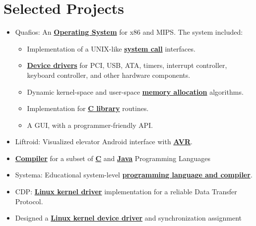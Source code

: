 \documentclass[letterpaper]{twentysecondcv} %
\begin{document}

\section{Selected Projects}

\begin{itemize}
    \item{Quafios: An \textbf{\underline{Operating System}} for x86 and MIPS. The system included:
          \begin{itemize}
            \item Implementation of a UNIX-like \textbf{\underline{system call}} interfaces.
            \item \textbf{\underline{Device drivers}} for PCI, USB, ATA, timers, interrupt controller,
                  keyboard controller, and other hardware components.
            \item Dynamic kernel-space and user-space \textbf{\underline{memory allocation}} algorithms.
            \item Implementation for \textbf{\underline{C library}} routines.
            \item A GUI, with a programmer-friendly API.
          \end{itemize}
          }
    \item{Liftroid: Visualized elevator Android interface with \textbf{\underline{AVR}}.}
    \item{\textbf{\underline{Compiler}} for a subset of \textbf{\underline{C}} and
          \textbf{\underline{Java}} Programming Languages}
    \item{Systema: Educational system-level \textbf{\underline{programming language and compiler}}.}
    \item{CDP: \textbf{\underline{Linux kernel driver}} implementation for a reliable Data Transfer Protocol.}
    \item{Designed a \textbf{\underline{Linux kernel device driver}} and synchronization assignment
}
\end{itemize}
\end{document}
